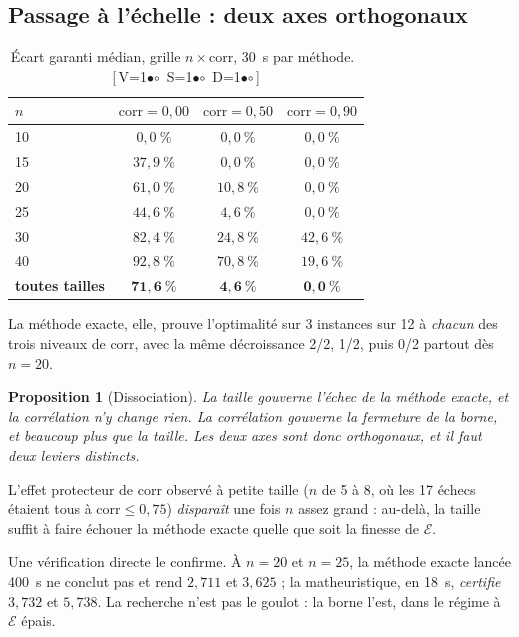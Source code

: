 \documentclass[11pt,a4paper]{article}
\theoremstyle{plain}
\newtheorem{proposition}{Proposition}
\theoremstyle{remark}
\newcommand{\Ecal}{\mathcal{E}}
\newcommand{\cfgm}[1]{\ifnum#1=1$\bullet$\else$\circ$\fi}
\newcommand{\conf}[3]{%
  \textsf{\footnotesize[\,V\cfgm{#1}\ S\cfgm{#2}\ D\cfgm{#3}\,]}}
\begin{document}
\subsection{Passage à l'échelle : deux axes orthogonaux}
\label{sec:echelle}

\begin{table}[H]
\centering
\caption{Écart garanti médian, grille $n\times\text{corr}$, 30~s par méthode.\ \conf{0}{0}{0}}
\label{tab:echelle}
\begin{tabular}{lccc}
\toprule
$n$ & $\text{corr}=0{,}00$ & $\text{corr}=0{,}50$ & $\text{corr}=0{,}90$\\
\midrule
10 & $0{,}0\ \%$ & $0{,}0\ \%$ & $0{,}0\ \%$\\
15 & $37{,}9\ \%$ & $0{,}0\ \%$ & $0{,}0\ \%$\\
20 & $61{,}0\ \%$ & $10{,}8\ \%$ & $0{,}0\ \%$\\
25 & $44{,}6\ \%$ & $4{,}6\ \%$ & $0{,}0\ \%$\\
30 & $82{,}4\ \%$ & $24{,}8\ \%$ & $42{,}6\ \%$\\
40 & $92{,}8\ \%$ & $70{,}8\ \%$ & $19{,}6\ \%$\\
\midrule
\textbf{toutes tailles} & $\mathbf{71{,}6\ \%}$ & $\mathbf{4{,}6\ \%}$
& $\mathbf{0{,}0\ \%}$\\
\bottomrule
\end{tabular}
\end{table}

\noindent
La méthode exacte, elle, prouve l'optimalité sur 3 instances sur 12 à
\emph{chacun} des trois niveaux de corr, avec la même décroissance 2/2, 1/2,
puis 0/2 partout dès $n=20$.

\begin{proposition}[Dissociation]
La taille gouverne l'échec de la méthode exacte, et la corrélation n'y change
rien. La corrélation gouverne la fermeture de la borne, et beaucoup plus que
la taille. Les deux axes sont donc \emph{orthogonaux}, et il faut deux
leviers distincts.
\end{proposition}

\noindent
L'effet protecteur de corr observé à petite taille ($n$ de 5 à 8, où les
17 échecs étaient tous à $\text{corr}\le 0{,}75$) \emph{disparaît} une fois
$n$ assez grand : au-delà, la taille suffit à faire échouer la méthode exacte
quelle que soit la finesse de $\Ecal$.

Une vérification directe le confirme. À $n=20$ et $n=25$, la méthode exacte
lancée 400~s ne conclut pas et rend $2{,}711$ et $3{,}625$ ; la
matheuristique, en 18~s, \emph{certifie} $3{,}732$ et $5{,}738$. La recherche
n'est pas le goulot : la borne l'est, dans le régime à $\Ecal$ épais.
\end{document}
